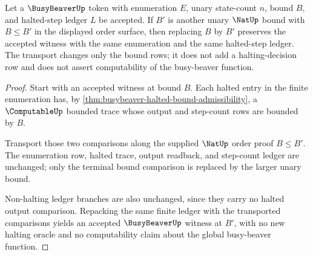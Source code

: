 \begin{theorem}
\label{thm:busybeaver-bound-monotonicity}
Let a $\BusyBeaverUp$ token with enumeration $E$, unary state-count $n$, bound
$B$, and halted-step ledger $L$ be accepted. If $B'$ is another unary
$\NatUp$ bound with $B \leq B'$ in the displayed order surface, then replacing
$B$ by $B'$ preserves the accepted witness with the same enumeration and the
same halted-step ledger. The transport changes only the bound rows; it does not
add a halting-decision row and does not assert computability of the
busy-beaver function.
\end{theorem}
\begin{proof}
Start with an accepted witness at bound $B$. Each halted entry in the finite
enumeration has, by
\autoref{thm:busybeaver-halted-bound-admissibility}, a $\ComputableUp$
bounded trace whose output and step-count rows are bounded by $B$.

Transport those two comparisons along the supplied $\NatUp$ order proof
$B \leq B'$. The enumeration row, halted trace, output readback, and step-count
ledger are unchanged; only the terminal bound comparison is replaced by the
larger unary bound.

Non-halting ledger branches are also unchanged, since they carry no halted
output comparison. Repacking the same finite ledger with the transported
comparisons yields an accepted $\BusyBeaverUp$ witness at $B'$, with no new
halting oracle and no computability claim about the global busy-beaver
function.
\end{proof}

